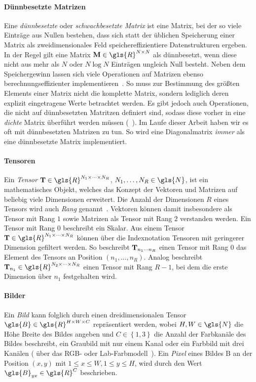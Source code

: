 \paragraph{Dünnbesetzte Matrizen}

Eine \emph{dünnbesetzte} oder \emph{schwachbesetzte Matrix} ist eine Matrix, bei der so viele Einträge aus Nullen bestehen, dass sich statt der üblichen Speicherung einer Matrix als zweidimensionales Feld speichereffizientiere Datenstrukturen ergeben.
In der Regel gilt eine Matrix $\ma{M}\in \gls{R}^{N \times N}$ als dünnbesetzt, wenn diese nicht aus mehr als $N$ oder $N \log N$ Einträgen ungleich Null besteht.
Neben dem Speichergewinn lassen sich viele Operationen auf Matrizen ebenso berechnungseffizienter implementieren~\cite{Saad}.
So muss \zB{} zur Bestimmung des größten Elements einer Matrix nicht die komplette Matrix, sondern lediglich deren explizit eingetragene Werte betrachtet werden.
Es gibt jedoch auch Operationen, die nicht auf dünnbesetzten Matritzen definiert sind, sodass diese vorher in eine \emph{dichte} Matrix überführt werden müssen (\vgl{}~\cite{Saad}).
Im Laufe dieser Arbeit haben wir es oft mit dünnbesetzten Matrizen zu tun.
So wird \zB{} eine Diagonalmatrix \emph{immer} als eine dünnbesetzte Matrix implementiert.

\paragraph{Tensoren}

Ein \emph{Tensor} $\ma{T} \in \gls{R}^{N_1 \times \cdots \times N_R}$, $N_1, \ldots, N_R \in \gls{N}$, ist ein mathematisches Objekt, welches das Konzept der Vektoren und Matrizen auf beliebig viele Dimensionen erweitert.
Die Anzahl der Dimensionen $R$ eines Tensors wird auch \emph{Rang} genannt~\cite{linear}.
Vektoren können damit insbesondere als Tensor mit Rang $1$ sowie Matrizen als Tensor mit Rang $2$ verstanden werden.
Ein Tensor mit Rang $0$ beschreibt ein Skalar.
Aus einem Tensor $\ma{T} \in \gls{R}^{N_1 \times \cdots \times N_R}$ können über die Indexnotation Tensoren mit geringerer Dimension gefiltert werden.
So beschreibt $\mathbf{T}_{n_1 \cdots n_R}$ einen Tensor mit Rang $0$ \bzw{} das Element des Tensors an Position $\left(n_1, \ldots, n_R\right)$.
Analog beschreibt \zB{} $\ma{T}_{n_1} \in \gls{R}^{N_2 \times \cdots \times N_R}$ einen Tensor mit Rang $R-1$, bei dem die erste Dimension über $n_1$ festgehalten wird.

\paragraph{Bilder}

Ein \emph{Bild} kann folglich durch einen dreidimensionalen Tensor $\gls{B} \in \gls{R}^{H \times W \times C}$ repräsentiert werden, wobei $H, W \in \gls{N}$ die Höhe \bzw{} Breite des Bildes angeben und $C \in \left\{1, 3\right\}$ die Anzahl der Farbkanäle des Bildes beschreibt, \dhe{} ein Graubild mit nur einem Kanal oder ein Farbbild mit drei Kanälen (\zB{} über das RGB- oder Lab-Farbmodell~\cite{lab}).
Ein \emph{Pixel} eines Bildes \gls{B} an der Position $\left(x, y\right)$ mit $1 \leq x \leq W, 1 \leq y \leq H$, wird durch den Wert $\gls{B}_{yx} \in \gls{R}^C$ beschrieben.
